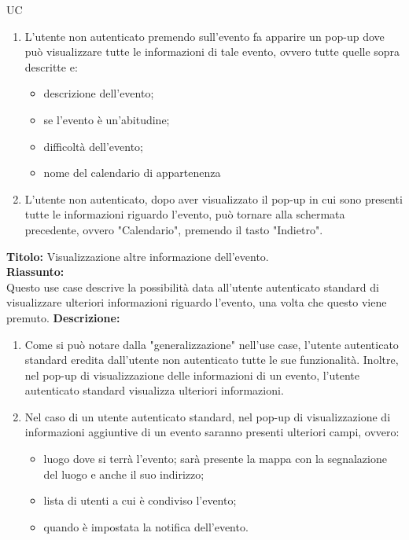\begin{listaPersonale}{UC}
\begin{listaPersonale2} [UC] {}
\begin{enumerate}
\begin{itemize}
                  \end{itemize}

            \item L'utente non autenticato premendo sull'evento fa apparire un pop-up dove può visualizzare tutte le informazioni di tale evento, ovvero tutte quelle sopra descritte e:
                  \begin{itemize}
                      \item descrizione dell'evento;
                      \item se l'evento è un'abitudine;
                      \item difficoltà dell'evento;
                      \item nome del calendario di appartenenza
                  \end{itemize}
            \item L'utente non autenticato, dopo aver visualizzato il pop-up in cui sono presenti tutte le informazioni riguardo l'evento, può tornare alla schermata precedente, ovvero "Calendario", premendo il tasto "Indietro".
        \end{enumerate}
        \textbf{Titolo: } Visualizzazione altre informazione dell'evento. \\
        \textbf{Riassunto: } \\ Questo use case descrive la possibilità data all'utente autenticato standard di visualizzare ulteriori informazioni riguardo l'evento, una volta che questo viene premuto.
        \textbf{Descrizione: }
        \begin{enumerate}
            \item Come si può notare dalla "generalizzazione" nell'use case, l'utente autenticato standard eredita dall'utente non autenticato tutte le sue funzionalità. Inoltre, nel pop-up di visualizzazione delle informazioni di un evento, l'utente autenticato standard visualizza ulteriori informazioni.
            \item Nel caso di un utente autenticato standard, nel pop-up di visualizzazione di informazioni aggiuntive di un evento saranno presenti ulteriori campi, ovvero:
                  \begin{itemize}
                      \item luogo dove si terrà l'evento; sarà presente la mappa con la segnalazione del luogo e anche il suo indirizzo;
                      \item lista di utenti a cui è condiviso l'evento;
                      \item quando è impostata la notifica dell'evento.
                  \end{itemize}
        \end{enumerate}


\end{listaPersonale2}
\end{listaPersonale}
